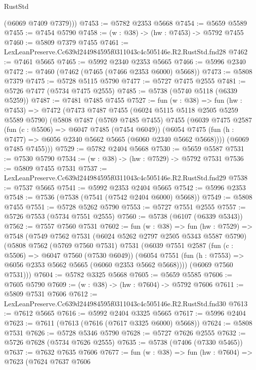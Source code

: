 \begin{lexlean}{RustStd}
\begin{coremodule}
        (@6069 @7409 @7379)))
@7453 := @5782 @2353 @5668
@7454 := @5659 @5589
@7455 := @7454 @5790
@7458 := (w : @38) -> (hw : @7453) -> @5792 @7455
@7460 := @5809 @7379 @7455
@7461 := LexLeanPreserve.Cc639d244984595f0311043c4c505146e.R2.RustStd.fnd28
@7462 := @7461 @5665
@7465 := @5992 @2340 @2353 @5665
@7466 := @5996 @2340
@7472 := @7460 (@7462 (@7465 (@7466 @2353 @6000) @5668))
@7473 := @5808 @7379
@7475 := @5728 @5115 @5790
@7477 := @5727 @7475 @2555
@7481 := @5726 @7477 (@5734 @7475 @2555)
@7485 := @5738 (@5740 @5118 (@6339 @5259))
@7487 := @7481 @7485 @7455
@7527 := fun (w : @38) =>
  fun (hw : @7453) =>
  @7472
    (@7473
      @7487
      @7455
      (@6024 @5115 @5118 @2505 @5259 @5589 @5790)
      (@5808
        @7487
        (@5769 @7485 @7455)
        @7455
        (@6039
          @7475
          @2587
          (fun (c : @5506) => @6047 @7485 (@7454 @6049))
          (@6054 @7475 (fun (h : @7477) => @6056 @2340 @5662 @5665 (@6060 @2340 @5662 @5668))))
        (@6069 @7485 @7455)))
@7529 := @5782 @2404 @5668
@7530 := @5659 @5587
@7531 := @7530 @5790
@7534 := (w : @38) -> (hw : @7529) -> @5792 @7531
@7536 := @5809 @7455 @7531
@7537 := LexLeanPreserve.Cc639d244984595f0311043c4c505146e.R2.RustStd.fnd29
@7538 := @7537 @5665
@7541 := @5992 @2353 @2404 @5665
@7542 := @5996 @2353
@7548 := @7536 (@7538 (@7541 (@7542 @2404 @6000) @5668))
@7549 := @5808 @7455
@7551 := @5728 @5262 @5790
@7553 := @5727 @7551 @2555
@7557 := @5726 @7553 (@5734 @7551 @2555)
@7560 := @5738 (@6107 (@6339 @5343))
@7562 := @7557 @7560 @7531
@7602 := fun (w : @38) =>
  fun (hw : @7529) =>
  @7548
    (@7549
      @7562
      @7531
      (@6024 @5262 @2797 @2505 @5343 @5587 @5790)
      (@5808
        @7562
        (@5769 @7560 @7531)
        @7531
        (@6039
          @7551
          @2587
          (fun (c : @5506) => @6047 @7560 (@7530 @6049))
          (@6054 @7551 (fun (h : @7553) => @6056 @2353 @5662 @5665 (@6060 @2353 @5662 @5668))))
        (@6069 @7560 @7531)))
@7604 := @5782 @3325 @5668
@7605 := @5659 @5585
@7606 := @7605 @5790
@7609 := (w : @38) -> (hw : @7604) -> @5792 @7606
@7611 := @5809 @7531 @7606
@7612 := LexLeanPreserve.Cc639d244984595f0311043c4c505146e.R2.RustStd.fnd30
@7613 := @7612 @5665
@7616 := @5992 @2404 @3325 @5665
@7617 := @5996 @2404
@7623 := @7611 (@7613 (@7616 (@7617 @3325 @6000) @5668))
@7624 := @5808 @7531
@7626 := @5728 @5346 @5790
@7628 := @5727 @7626 @2555
@7632 := @5726 @7628 (@5734 @7626 @2555)
@7635 := @5738 (@7406 (@7330 @5465))
@7637 := @7632 @7635 @7606
@7677 := fun (w : @38) =>
  fun (hw : @7604) =>
  @7623
    (@7624
      @7637
      @7606

\end{coremodule}
\end{lexlean}
